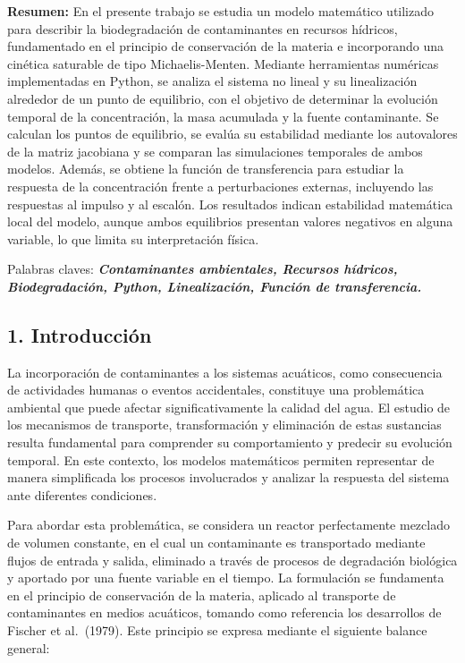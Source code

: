 \documentclass[11pt]{article}
\begin{document}
    \textbf{Resumen:} En el presente trabajo se estudia un modelo matemático
utilizado para describir la biodegradación de contaminantes en recursos
hídricos, fundamentado en el principio de conservación de la materia e
incorporando una cinética saturable de tipo Michaelis-Menten. Mediante
herramientas numéricas implementadas en Python, se analiza el sistema no
lineal y su linealización alrededor de un punto de equilibrio, con el
objetivo de determinar la evolución temporal de la concentración, la
masa acumulada y la fuente contaminante. Se calculan los puntos de
equilibrio, se evalúa su estabilidad mediante los autovalores de la
matriz jacobiana y se comparan las simulaciones temporales de ambos
modelos. Además, se obtiene la función de transferencia para estudiar la
respuesta de la concentración frente a perturbaciones externas,
incluyendo las respuestas al impulso y al escalón. Los resultados
indican estabilidad matemática local del modelo, aunque ambos
equilibrios presentan valores negativos en alguna variable, lo que
limita su interpretación física.

Palabras claves: \textbf{\emph{Contaminantes ambientales, Recursos
hídricos, Biodegradación, Python, Linealización, Función de
transferencia.}}

    \subsection{1. Introducción}\label{introducciuxf3n}

La incorporación de contaminantes a los sistemas acuáticos, como
consecuencia de actividades humanas o eventos accidentales, constituye
una problemática ambiental que puede afectar significativamente la
calidad del agua. El estudio de los mecanismos de transporte,
transformación y eliminación de estas sustancias resulta fundamental
para comprender su comportamiento y predecir su evolución temporal. En
este contexto, los modelos matemáticos permiten representar de manera
simplificada los procesos involucrados y analizar la respuesta del
sistema ante diferentes condiciones.

Para abordar esta problemática, se considera un reactor perfectamente
mezclado de volumen constante, en el cual un contaminante es
transportado mediante flujos de entrada y salida, eliminado a través de
procesos de degradación biológica y aportado por una fuente variable en
el tiempo. La formulación se fundamenta en el principio de conservación
de la materia, aplicado al transporte de contaminantes en medios
acuáticos, tomando como referencia los desarrollos de Fischer et
al.~(1979). Este principio se expresa mediante el siguiente balance
general:
\end{document}
